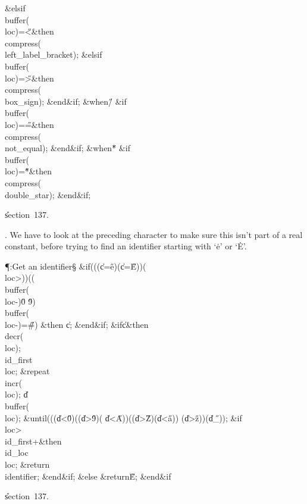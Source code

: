 \4\&{elsif}\1\8\\{buffer}\?\1(\?\\{loc}\?\2)=\?\H{<}\2\8\&{then}\6
\\{compress}\?\1(\?\\{left\_label\_bracket}\?\2)\?;\6
\4\&{elsif}\1\8\\{buffer}\?\1(\?\\{loc}\?\2)=\?\H{>}\2\8\&{then}\6
\\{compress}\?\1(\?\\{box\_sign}\?\2)\?;\2\6
\&{end}\8\2\&{if}\1;\6
\4\&{when}\8\H{/}\KR\6
\&{if}\1\1\8\\{buffer}\?\1(\?\\{loc}\?\2)=\?\H{=}\2\8\&{then}\6
\\{compress}\?\1(\?\\{not\_equal}\?\2)\?;\2\6
\&{end}\8\2\&{if}\1;\6
\4\&{when}\8\H{*}\KR\6
\&{if}\1\1\8\\{buffer}\?\1(\?\\{loc}\?\2)=\?\H{*}\2\8\&{then}\6
\\{compress}\?\1(\?\\{double\_star}\?\2)\?;\2\6
\&{end}\8\2\&{if}\1;\par
\U section~137.\fi

. We have to look at the preceding character to make sure this isn't part
of a real constant, before trying to find an identifier starting with
`\.e' or `\.E'.

\Y\P\?\4:Get an identifier\X\S\?\6
\&{if}\1\1\?\8\1(\1(\1(\?\|c\?=\?\H{e}\?\2)\V\1(\?\|c\?=\?\H{E}\?\2)\2)\W\1(\?%
\\{loc}\?>\?\2)\2)\ANT\1(\1(\?\\{buffer}\?\1(\?\\{loc}\?-\?\2)\in\?\H{0}%
\?\to\?\H{9}\?\2)\V\?\\{buffer}\?\1(\?\\{loc}\?-\?\2)=\?\H{\#}\?\2)\?\2\8%
\&{then}\6
\|c\?\K{};\2\6
\&{end}\8\2\&{if}\1;\6
\&{if}\1\1\8\|c\?\I{}\2\8\&{then}\6
\\{decr}\?\1(\?\\{loc}\?\2)\?;\5
\\{id\_first}\?\K\?\\{loc};\6
\1\&{repeat}\6
\\{incr}\?\1(\?\\{loc}\?\2)\?;\5
\|d\?\K\?\\{buffer}\?\1(\?\\{loc}\?\2)\?;\2\6
\&{until}\?\8\1(\1(\1(\?\|d\?<\?\H{0}\?\2)\V\1(\1(\?\|d\?>\?\H{9}\?\2)\W\1(\?%
\|d\?<\?\H{A}\?\2)\2)\V\1(\1(\?\|d\?>\?\H{Z}\?\2)\W\1(\?\|d\?<\?\H{a}\?\2)\2)\V%
\1(\?\|d\?>\?\H{z}\?\2)\2)\W\1(\?\|d\?\I\?\H{\_}\?\2)\2)\?;\6
\&{if}\1\1\8\\{loc}\?>\?\\{id\_first}\?+\2\8\&{then}\6
\\{id\_loc}\?\K\?\\{loc};\5
\?\&{return}\?\8\\{identifier};\2\6
\&{end}\8\2\&{if}\1;\6
\4\&{else}\6
\?\&{return}\?\8\H{E};\2\6
\&{end}\8\2\&{if}\1\par
\U section~137.\fi

